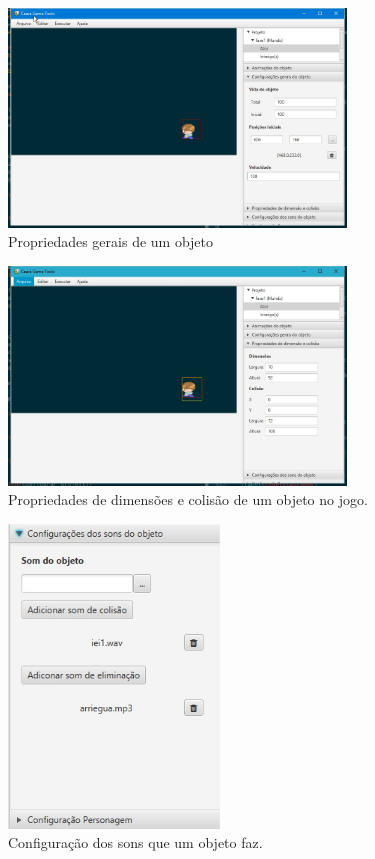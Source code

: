 \documentclass[12pt,oneside,openright,a4paper,english,brazil,sumario=tradicional]{abntex2}
\begin{document}
\begin{anexosenv}
   \begin{figure}[H]
   \centering
   \includegraphics[width=0.8\textwidth]{images/obj_props_geral}
   \caption{Propriedades gerais de um objeto}
   \label{fig:obj_props_geral}
   \end{figure}

   \begin{figure}[H]
   \centering
   \includegraphics[width=0.8\textwidth]{images/obj_props_dim.jpg}
   \caption{Propriedades de dimensões e colisão de um objeto no jogo.}
   \label{fig:obj_props_dim}
   \end{figure}

   \begin{figure}[H]
   \centering
   \includegraphics[width=0.5\textwidth]{images/obj_sons.jpg}
   \caption{Configuração dos sons que um objeto faz.}
   \label{fig:obj_sons}
   \end{figure}


\end{anexosenv}
\end{document}

